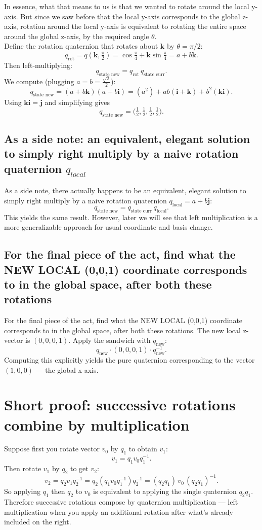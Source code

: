 \documentclass[11pt]{article}
\begin{document}
In essence, what that means to us is that we wanted to rotate around the local y-axis. But since we saw before that the local y-axis corresponds to the global z-axis, rotation around the local y-axis is equivalent to rotating the entire space around the global z-axis, by the required angle \(\theta\).
\\
Define the rotation quaternion that rotates about \(\mathbf{k}\) by \(\theta=\pi/2\):
\[
q_{\text{rot}} = q(\mathbf{k},\tfrac{\pi}{2})
= \cos\tfrac{\pi}{4} + \mathbf{k}\sin\tfrac{\pi}{4}
= a + b\mathbf{k}.
\]
Then left-multiplying:
\[
q_{\text{state new}} = q_{\text{rot}} \, q_{\text{state curr}}.
\]
We compute (plugging \(a=b=\tfrac{\sqrt{2}}{2}\)):
\[
q_{\text{state new}} = (a + b\mathbf{k})(a + b\mathbf{i})
= (a^2)\!+\!ab(\mathbf{i} + \mathbf{k}) + b^2(\mathbf{k}\mathbf{i}).
\]
Using \(\mathbf{k}\mathbf{i}=\mathbf{j}\) and simplifying gives
\[
q_{\text{state new}} = \Big(\tfrac{1}{2},\tfrac{1}{2},\tfrac{1}{2},\tfrac{1}{2}\Big).
\]

\subsection{As a side note: an equivalent, elegant solution to simply right multiply by a naive rotation quaternion $q_{local}$}
As a side note, there actually happens to be an equivalent, elegant solution to simply right multiply by a naive rotation quaternion \(q_\text{local} = a + b\mathbf{j}\):
\[
q_{\text{state new}} = q_{\text{state curr}} \, q_\text{local}.
\]
This yields the same result. However, later we will see that left multiplication is a more generalizable approach for usual coordinate and basis change.

\subsection{For the final piece of the act, find what the NEW LOCAL (0,0,1) coordinate corresponds to in the global space, after both these rotations}
For the final piece of the act, find what the NEW LOCAL (0,0,1) coordinate corresponds to in the global space, after both these rotations. The new local z-vector is \((0,0,0,1)\). Apply the sandwich with \(q_{\text{new}}\):
\[
q_{\text{new}} \cdot (0,0,0,1) \cdot q_{\text{new}}^{-1}.
\]
Computing this explicitly yields the pure quaternion corresponding to the vector \((1,0,0)\) — the global x-axis.

\section{Short proof: successive rotations combine by multiplication}
Suppose first you rotate vector \(v_0\) by \(q_1\) to obtain \(v_1\):
\[
v_1 = q_1 v_0 q_1^{-1}.
\]
Then rotate \(v_1\) by \(q_2\) to get \(v_2\):
\[
v_2 = q_2 v_1 q_2^{-1} = q_2 (q_1 v_0 q_1^{-1}) q_2^{-1}
    = (q_2 q_1)\, v_0 \, (q_2 q_1)^{-1}.
\]
So applying \(q_1\) then \(q_2\) to \(v_0\) is equivalent to applying the single
quaternion \(q_2 q_1\). Therefore successive rotations compose by quaternion
multiplication — left multiplication when you apply an additional rotation after
what's already included on the right.
\end{document}
